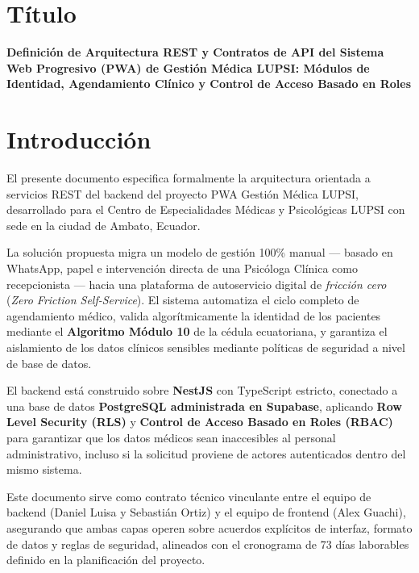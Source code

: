\documentclass[a4paper,12pt]{article}
\begin{document}
\raggedbottom

\section{Título}
\textbf{Definición de Arquitectura REST y Contratos de API del Sistema Web Progresivo (PWA) de Gestión Médica LUPSI: Módulos de Identidad, Agendamiento Clínico y Control de Acceso Basado en Roles}

\section{Introducción}
El presente documento especifica formalmente la arquitectura orientada a servicios REST del backend del proyecto PWA Gestión Médica LUPSI, desarrollado para el Centro de Especialidades Médicas y Psicológicas LUPSI con sede en la ciudad de Ambato, Ecuador.

La solución propuesta migra un modelo de gestión 100\% manual — basado en WhatsApp, papel e intervención directa de una Psicóloga Clínica como recepcionista — hacia una plataforma de autoservicio digital de \textit{fricción cero} (\textit{Zero Friction Self-Service}). El sistema automatiza el ciclo completo de agendamiento médico, valida algorítmicamente la identidad de los pacientes mediante el \textbf{Algoritmo Módulo 10} de la cédula ecuatoriana, y garantiza el aislamiento de los datos clínicos sensibles mediante políticas de seguridad a nivel de base de datos.

El backend está construido sobre \textbf{NestJS} con TypeScript estricto, conectado a una base de datos \textbf{PostgreSQL administrada en Supabase}, aplicando \textbf{Row Level Security (RLS)} y \textbf{Control de Acceso Basado en Roles (RBAC)} para garantizar que los datos médicos sean inaccesibles al personal administrativo, incluso si la solicitud proviene de actores autenticados dentro del mismo sistema.

Este documento sirve como contrato técnico vinculante entre el equipo de backend (Daniel Luisa y Sebastián Ortiz) y el equipo de frontend (Alex Guachi), asegurando que ambas capas operen sobre acuerdos explícitos de interfaz, formato de datos y reglas de seguridad, alineados con el cronograma de 73 días laborables definido en la planificación del proyecto.

\end{document}
